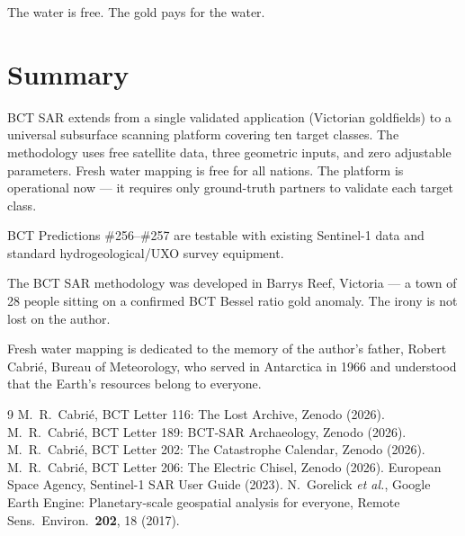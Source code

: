 \documentclass[aps,prl,twocolumn,superscriptaddress]{revtex4-2}
\begin{document}
The water is free. The gold pays for the water.

\section{Summary}

BCT SAR extends from a single validated application (Victorian goldfields) to a universal subsurface scanning platform covering ten target classes. The methodology uses free satellite data, three geometric inputs, and zero adjustable parameters. Fresh water mapping is free for all nations. The platform is operational now --- it requires only ground-truth partners to validate each target class.

BCT Predictions \#256--\#257 are testable with existing Sentinel-1 data and standard hydrogeological/UXO survey equipment.

\begin{acknowledgments}
The BCT SAR methodology was developed in Barrys Reef, Victoria --- a town of 28 people sitting on a confirmed BCT Bessel ratio gold anomaly. The irony is not lost on the author.

Fresh water mapping is dedicated to the memory of the author's father, Robert Cabri\'e, Bureau of Meteorology, who served in Antarctica in 1966 and understood that the Earth's resources belong to everyone.
\end{acknowledgments}

\begin{thebibliography}{9}
 M.~R.~Cabri\'e, BCT Letter 116: The Lost Archive, Zenodo (2026).
 M.~R.~Cabri\'e, BCT Letter 189: BCT-SAR Archaeology, Zenodo (2026).
 M.~R.~Cabri\'e, BCT Letter 202: The Catastrophe Calendar, Zenodo (2026).
 M.~R.~Cabri\'e, BCT Letter 206: The Electric Chisel, Zenodo (2026).
 European Space Agency, Sentinel-1 SAR User Guide (2023).
 N.~Gorelick \emph{et al.}, Google Earth Engine: Planetary-scale geospatial analysis for everyone, Remote Sens.\ Environ.\ \textbf{202}, 18 (2017).
\end{thebibliography}
\end{document}
